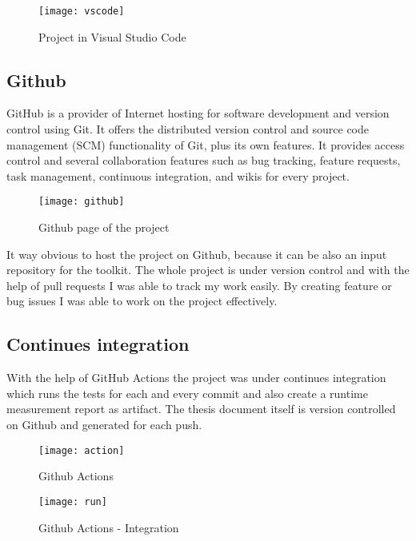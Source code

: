 \begin{figure}[H]
	\centering
	\texttt{[image: vscode]}
	\caption{Project in Visual Studio Code}
	\label{fig:fig-studio}
\end{figure}

\newpage
\subsection{Github}

GitHub is a provider of Internet hosting for software development and version control using Git. It offers the distributed version control and source code management (SCM) functionality of Git, plus its own features. It provides access control and several collaboration features such as bug tracking, feature requests, task management, continuous integration, and wikis for every project.\cite{gitbib}

\begin{figure}[H]
	\centering
	\texttt{[image: github]}
	\caption{Github page of the project}
	\label{fig:fig-github}
\end{figure}

It way obvious to host the project on Github, because it can be also an input repository for the toolkit. The whole project is under version control and with the help of pull requests I was able to track my work easily. By creating feature or bug issues I was able to work on the project effectively.

\newpage
\subsection{Continues integration}

With the help of GitHub Actions the project was under continues integration which runs the tests for each and every commit and also create a runtime measurement report as artifact. 
The thesis document itself is version controlled on Github and generated for each push. 

\begin{figure}[H]
	\centering
	\texttt{[image: action]}
	\caption{Github Actions}
	\label{fig:fig-act}
\end{figure}


\begin{figure}[H]
	\centering
	\texttt{[image: run]}
	\caption{Github Actions - Integration}
	\label{fig:fig-int}
\end{figure}


